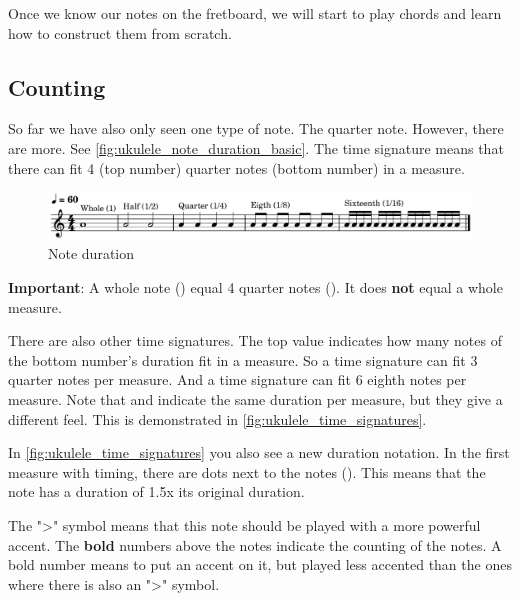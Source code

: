 Once we know our notes on the fretboard, we will start to play chords and learn how to construct them from scratch.

\newpage

\subsection{Counting}

So far we have also only seen one type of note. The quarter note. However, there are more. See \autoref{fig:ukulele_note_duration_basic}. The  time signature means that there can fit 4 (top number) quarter notes (bottom number) in a measure. 

\begin{figure}[h]
	\centering
	\includegraphics[width=\textwidth]{../../MuseScore/Ukulele/MusicNotation/NoteDurations_Basic.png}
	\caption{Note duration}
	\label{fig:ukulele_note_duration_basic}
\end{figure}

\textbf{Important}: A whole note (\wholeNote) equal 4 quarter notes (\quarterNote). It does \textbf{not} equal a whole measure. \newline

There are also other time signatures. The top value indicates how many notes of the bottom number's duration fit in a measure. So a  time signature can fit 3 quarter notes per measure. And a  time signature can fit 6 eighth notes per measure. Note that  and  indicate the same duration per measure, but they give a different feel. This is demonstrated in \autoref{fig:ukulele_time_signatures}.

In \autoref{fig:ukulele_time_signatures} you also see a new duration notation. In the first measure with  timing, there are dots next to the notes (\quarterNoteDottedDown). This means that the note has a duration of 1.5x its original duration.

The ">" symbol means that this note should be played with a more powerful accent. The \textbf{bold} numbers above the notes indicate the counting of the notes. A bold number means to put an accent on it, but played less accented than the ones where there is also an ">" symbol.

